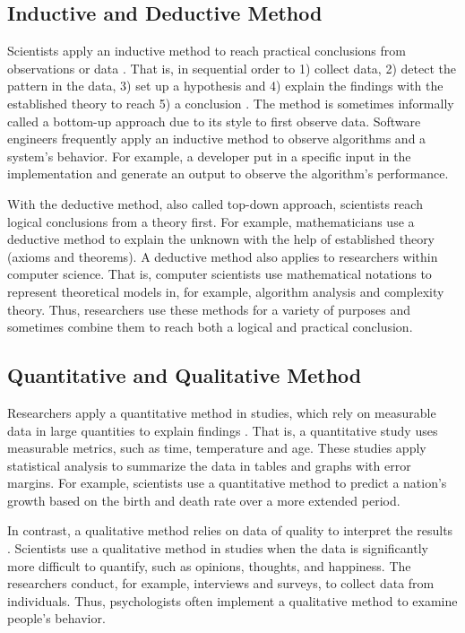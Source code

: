 \documentclass[a4paper,11pt]{kth-mag}
\newcommand*{\skippara}{\par\vspace{\baselineskip} \noindent}
\begin{document}
\subsection{Inductive and Deductive Method}
Scientists apply an inductive method to reach practical conclusions from observations or data \cite{Omexperi69:online}.
That is, in sequential order to 1) collect data, 2) detect the pattern in the data, 3) set up a hypothesis and 4) explain the findings with the established theory to reach 5) a conclusion \cite{web:induction}.
The method is sometimes informally called a bottom-up approach due to its style to first observe data.
Software engineers frequently apply an inductive method to observe algorithms and a system's behavior.
For example, a developer put in a specific input in the implementation and generate an output to observe the algorithm's performance.

\skippara With the deductive method, also called top-down approach, scientists reach logical conclusions from a theory first.
For example, mathematicians use a deductive method to explain the unknown with the help of established theory (axioms and theorems).
A deductive method also applies to researchers within computer science.
That is, computer scientists use mathematical notations to represent theoretical models in, for example, algorithm analysis and complexity theory.
Thus, researchers use these methods for a variety of purposes and sometimes combine them to reach both a logical and practical conclusion.

\subsection{Quantitative and Qualitative Method}
Researchers apply a quantitative method in studies, which rely on measurable data in large quantities to explain findings \cite{haakansson2013portal}.
That is, a quantitative study uses measurable metrics, such as time, temperature and age.
These studies apply statistical analysis to summarize the data in tables and graphs with error margins.
For example, scientists use a quantitative method to predict a nation's growth based on the birth and death rate over a more extended period.

\skippara In contrast, a qualitative method relies on data of quality to interpret the results \cite{merriam2009qualitative}.
Scientists use a qualitative method in studies when the data is significantly more difficult to quantify, such as opinions, thoughts, and happiness.
The researchers conduct, for example, interviews and surveys, to collect data from individuals.
Thus, psychologists often implement a qualitative method to examine people's behavior.
\end{document}
